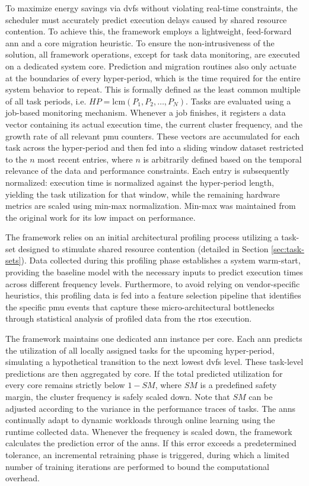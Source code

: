 \documentclass[journal]{IEEEtran}
\begin{document}
To maximize energy savings via \gls{dvfs} without violating real-time constraints, the scheduler must accurately predict execution delays caused by shared resource contention. To achieve this, the framework employs a lightweight, feed-forward \gls{ann} and a core migration heuristic. To ensure the non-intrusiveness of the solution, all framework operations, except for task data monitoring, are executed on a dedicated system core. Prediction and migration routines also only actuate at the boundaries of every hyper-period, which is the time required for the entire system behavior to repeat. This is formally defined as the least common multiple of all task periods, i.e. $HP = \text{lcm}(P_1, P_2, \dots, P_N)$. Tasks are evaluated using a job-based monitoring mechanism. Whenever a job finishes, it registers a data vector containing its actual execution time, the current cluster frequency, and the growth rate of all relevant \gls{pmu} counters. These vectors are accumulated for each task across the hyper-period and then fed into a sliding window dataset restricted to the $n$ most recent entries, where $n$ is arbitrarily defined based on the temporal relevance of the data and performance constraints. Each entry is subsequently normalized: execution time is normalized against the hyper-period length, yielding the task utilization for that window, while the remaining hardware metrics are scaled using min-max normalization. Min-max was maintained from the original work for its low impact on performance.

The framework relies on an initial architectural profiling process utilizing a task-set designed to stimulate shared resource contention (detailed in Section \ref{sec:task-sets}). Data collected during this profiling phase establishes a system warm-start, providing the baseline model with the necessary inputs to predict execution times across different frequency levels. Furthermore, to avoid relying on vendor-specific heuristics, this profiling data is fed into a feature selection pipeline that identifies the specific \gls{pmu} events that capture these micro-architectural bottlenecks through statistical analysis of profiled data from the \gls{rtos} execution.

The framework maintains one dedicated \gls{ann} instance per core. Each \gls{ann} predicts the utilization of all locally assigned tasks for the upcoming hyper-period, simulating a hypothetical transition to the next lowest \gls{dvfs} level. These task-level predictions are then aggregated by core. If the total predicted utilization for every core remains strictly below $1 - SM$, where $SM$ is a predefined safety margin, the cluster frequency is safely scaled down. Note that $SM$ can be adjusted according to the variance in the performance traces of tasks. The \glspl{ann} continually adapt to dynamic workloads through online learning using the runtime collected data. Whenever the frequency is scaled down, the framework calculates the prediction error of the \glspl{ann}. If this error exceeds a predetermined tolerance, an incremental retraining phase is triggered, during which a limited number of training iterations are performed to bound the computational overhead.
\end{document}
